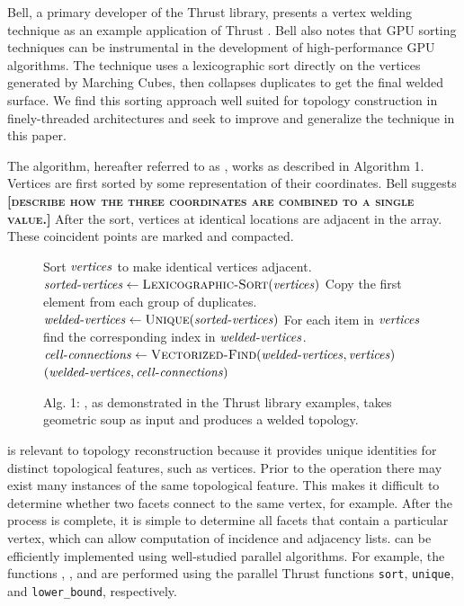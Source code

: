 \documentclass[10pt,journal,cspaper,compsoc]{IEEEtran}
\newcommand{\fix}[1]{{\color{red}\textbf{\textsc{[#1]}}}}
\begin{document}
Bell, a primary
developer of the Thrust library, presents a vertex welding technique as an
example application of Thrust \cite{Bell2010}. Bell also notes that GPU sorting techniques can
be instrumental in the development of high-performance GPU algorithms. The technique uses a
lexicographic sort directly on the vertices generated by Marching Cubes, then collapses 
duplicates to get the final welded surface.
We find this sorting approach well suited for topology construction in
finely-threaded architectures and seek to improve and generalize the
technique in this paper.

The algorithm, hereafter referred to as , works as
described in Algorithm 1.  Vertices are first sorted by some representation
of their coordinates.  Bell suggests \fix{describe how the three
  coordinates are combined to a single value.}  After the sort, vertices at
identical locations are adjacent in the array.  These coincident points are
marked and compacted.

\begin{figure}[h!]
\vspace{-0.3cm}
\begin{codebox}
  \zi \Comment Sort $\id{vertices}$ to make identical vertices adjacent.
  \li $\id{sorted-vertices} \gets \proc{Lexicographic-Sort}(\id{vertices})$
  \zi \Comment Copy the first element from each group of duplicates.
  \li $\id{welded-vertices} \gets \proc{Unique}(\id{sorted-vertices})$
  \zi \Comment For each item in $\id{vertices}$ find the corresponding index
  \zi \Comment in $\id{welded-vertices}$.
  \li $\id{cell-connections} \gets \proc{Vectorized-Find}(\id{welded-vertices},\id{vertices})$
  \li \Return $( \id{welded-vertices}, \id{cell-connections} )$
\end{codebox}
\vspace{-0.5cm}
\caption*{Alg. 1: , as demonstrated in the Thrust library examples, takes geometric soup as input and produces a welded topology.}
\end{figure}

 is relevant to topology reconstruction because it provides unique identities for distinct topological features, such as vertices. Prior to the operation there may exist many instances of the same topological feature. This makes it difficult to determine whether two facets connect to the same vertex, for example. After the  process is complete, it is simple to determine all facets that contain a particular vertex, which can allow computation of incidence and adjacency lists.   can be efficiently implemented using well-studied parallel algorithms.  For example, the functions ,
, and  are performed using the parallel
Thrust functions \texttt{sort}, \texttt{unique}, and \texttt{lower\_bound},
respectively.
\end{document}
